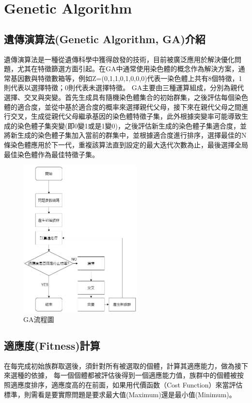 \chapter{Genetic Algorithm}
\label{chapter:intro}
\section{遺傳演算法(Genetic Algorithm, GA)介紹}
遺傳演算法是一種從遺傳科學中獲得啟發的技術，目前被廣泛應用於解決優化問題，尤其在特徵篩選方面引起。在GA中通常使用染色體的概念作為解決方案，通常基因數與特徵數箱等，例如Z=(0,1,1,0,1,0,0,0)代表一染色體上共有8個特徵，1則代表以選擇特徵；0則代表未選擇特徵。
GA主要由三種運算組成，分別為親代選擇、交叉與突變。首先生成具有隨機染色體集合的初始群集，之後評估每個染色體的適合度，並從中基於適合度的概率來選擇親代父母，接下來在親代父母之間進行交叉，生成從親代父母繼承基因的染色體特徵子集，此外根據突變率可能導致生成的染色體子集突變(即0變1或是1變0)，之後評估新生成的染色體子集適合度，並將新生成的染色體子集加入當前的群集中，並根據適合度進行排序，選擇最佳的N條染色體應用於下一代，重複該算法直到設定的最大迭代次數為止，最後選擇全局最佳染色體作為最佳特徵子集。
\begin{figure}[H]
	\centerline{\includegraphics[height=8cm]{pic/GAprocess .png}}
	\caption{GA流程圖}
	\label{fig:GApro}
\end{figure}

\label{sec:background}
\section{適應度(Fitness)計算}

在每完成初始族群取選後，須針對所有被選取的個體，計算其適應能力，做為接下來選種的依據， 每一個個體都被評估後得到一個適應能力值，族群中的個體被按照適應度排序，適應度高的在前面，如果用代價函数（Cost Function）來當評估標準，則需看是要實際問題是要求最大值(Maximum)還是最小值(Minimum)。
